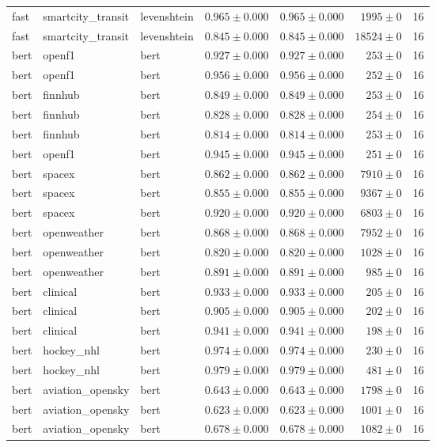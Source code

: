 \begin{table}[htbp]
\begin{tabular}{l l l r r r r}
fast & smartcity\_transit & levenshtein & $0.965\pm0.000$ & $0.965\pm0.000$ & $1995\pm0$ & 16 \\
fast & smartcity\_transit & levenshtein & $0.845\pm0.000$ & $0.845\pm0.000$ & $18524\pm0$ & 16 \\
bert & openf1 & bert & $0.927\pm0.000$ & $0.927\pm0.000$ & $253\pm0$ & 16 \\
bert & openf1 & bert & $0.956\pm0.000$ & $0.956\pm0.000$ & $252\pm0$ & 16 \\
bert & finnhub & bert & $0.849\pm0.000$ & $0.849\pm0.000$ & $253\pm0$ & 16 \\
bert & finnhub & bert & $0.828\pm0.000$ & $0.828\pm0.000$ & $254\pm0$ & 16 \\
bert & finnhub & bert & $0.814\pm0.000$ & $0.814\pm0.000$ & $253\pm0$ & 16 \\
bert & openf1 & bert & $0.945\pm0.000$ & $0.945\pm0.000$ & $251\pm0$ & 16 \\
bert & spacex & bert & $0.862\pm0.000$ & $0.862\pm0.000$ & $7910\pm0$ & 16 \\
bert & spacex & bert & $0.855\pm0.000$ & $0.855\pm0.000$ & $9367\pm0$ & 16 \\
bert & spacex & bert & $0.920\pm0.000$ & $0.920\pm0.000$ & $6803\pm0$ & 16 \\
bert & openweather & bert & $0.868\pm0.000$ & $0.868\pm0.000$ & $7952\pm0$ & 16 \\
bert & openweather & bert & $0.820\pm0.000$ & $0.820\pm0.000$ & $1028\pm0$ & 16 \\
bert & openweather & bert & $0.891\pm0.000$ & $0.891\pm0.000$ & $985\pm0$ & 16 \\
bert & clinical & bert & $0.933\pm0.000$ & $0.933\pm0.000$ & $205\pm0$ & 16 \\
bert & clinical & bert & $0.905\pm0.000$ & $0.905\pm0.000$ & $202\pm0$ & 16 \\
bert & clinical & bert & $0.941\pm0.000$ & $0.941\pm0.000$ & $198\pm0$ & 16 \\
bert & hockey\_nhl & bert & $0.974\pm0.000$ & $0.974\pm0.000$ & $230\pm0$ & 16 \\
bert & hockey\_nhl & bert & $0.979\pm0.000$ & $0.979\pm0.000$ & $481\pm0$ & 16 \\
bert & aviation\_opensky & bert & $0.643\pm0.000$ & $0.643\pm0.000$ & $1798\pm0$ & 16 \\
bert & aviation\_opensky & bert & $0.623\pm0.000$ & $0.623\pm0.000$ & $1001\pm0$ & 16 \\
bert & aviation\_opensky & bert & $0.678\pm0.000$ & $0.678\pm0.000$ & $1082\pm0$ & 16 \\

\end{tabular}
\end{table}
